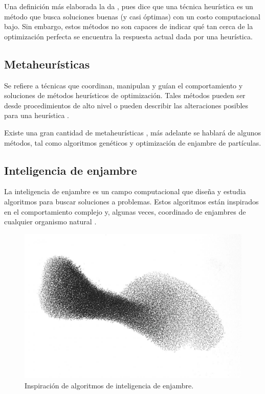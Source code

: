 \documentclass[letterpaper]{report}
\begin{document}
    Una definición más elaborada la da \cite{HeuristicDef}, pues dice
    que una técnica heurística es un método que busca soluciones buenas (y casi
    óptimas) con un costo computacional bajo. Sin embargo, estos métodos no son
    capaces de indicar qué tan cerca de la optimización perfecta se encuentra 
    la respuesta actual dada por una heurística.
  
  \subsection{Metaheurísticas}
    Se refiere a técnicas que coordinan, manipulan y guían el comportamiento y
    soluciones de métodos heurísticos de optimización. Tales métodos pueden ser
    desde procedimientos de alto nivel o pueden describir las alteraciones
    posibles para una heurística \cite{MetaheuristicsDef}.

    Existe una gran cantidad de metaheurísticas
    \cite{HeuristicDef, SearchMethodologies}, más adelante se hablará de algunos
    métodos, tal como algoritmos genéticos y optimización de enjambre de
    partículas.
  
  \subsection{Inteligencia de enjambre}
    La inteligencia de enjambre es un campo computacional que diseña y estudia
    algoritmos para buscar soluciones a problemas. Estos algoritmos están 
    inspirados en el comportamiento complejo y, algunas veces, coordinado de
    enjambres de cualquier organismo natural \cite{SearchMethodologies}. 
    
    \begin{figure}[ht!]
      \includegraphics[scale=0.18]{si-repr}
      \centering
      \caption{Inspiración de algoritmos de inteligencia de enjambre.}
      \centering
    \end{figure}
\end{document}
